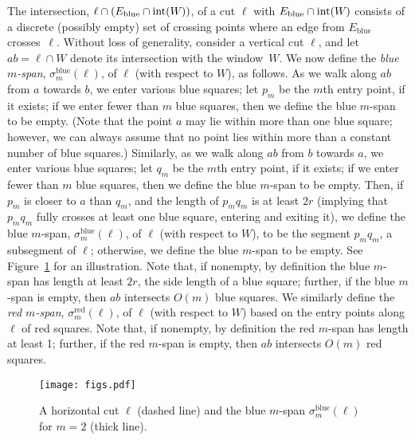 \documentclass[11pt,a4paper]{article}
\DeclareMathOperator{\interior}{int}
\newcommand{\intW}{\interior(W\mspace{-1mu})}
\newcommand{\blue}{\text{blue}}
\newcommand{\red}{\text{red}}
\theoremstyle{definition}
\theoremstyle{remark}
\begin{document}
The intersection, $\ell\cap (E_{\blue}\cap \intW)$, of a cut $\ell$ with
$E_{\blue}\cap \intW$ consists of a discrete (possibly empty) set of
crossing points where an edge from $E_{\blue}$ crosses~$\ell$.
Without loss of generality, consider a vertical cut $\ell$,
and let $ab=\ell\cap W$ denote its intersection with the window~$W$.
We now define the {\em blue $m$-span},
$\sigma_m^{\blue}(\ell)$, of $\ell$ (with respect to $W$), as follows.
As we walk along $ab$ from $a$ towards $b$, we enter various blue squares;
let $p_m$ be the $m$th entry point, if it exists; if we enter fewer than $m$
blue squares, then we define the blue $m$-span to be empty.
(Note that the point $a$ may lie within more than one blue square;
however, we can always assume that no point lies within more than a constant number of blue squares.)
Similarly, as we walk along $ab$ from $b$ towards $a$, we enter various blue squares;
let $q_m$ be the $m$th entry point, if it exists; if we enter fewer than $m$
blue squares, then we define the blue $m$-span to be empty.
Then, if $p_m$ is closer to $a$ than $q_m$, and the length of $p_mq_m$ is at least $2r$ (implying that
$p_mq_m$ fully crosses at least one blue square, entering and exiting it), we define the blue $m$-span,
$\sigma_m^{\blue}(\ell)$, of $\ell$ (with respect to $W$), to be the segment $p_mq_m$, a subsegment of $\ell$; otherwise,
we define the blue $m$-span to be empty. See Figure~\ref{fig:bluespan} for an illustration.
Note that, if nonempty, by definition the blue $m$-span has length at least $2r$, the side length of a blue square;
further, if the blue $m$-span is empty, then $ab$ intersects $O(m)$ blue squares.
We similarly
define the {\em red $m$-span}, $\sigma_m^{\red}(\ell)$, of $\ell$ (with
respect to $W$) based on the entry points along $\ell$ of red squares.
Note that, if nonempty, by definition the red $m$-span has length at least 1;
further, if the red $m$-span is empty, then $ab$ intersects $O(m)$ red squares.

\begin{figure}\centering
\texttt{[image: figs.pdf]}
\caption{A horizontal cut $\ell$ (dashed line) and the blue $m$-span $\sigma_m^{\blue}(\ell)$ for $m = 2$ (thick line).}\label{fig:bluespan}
\end{figure}
\end{document}
